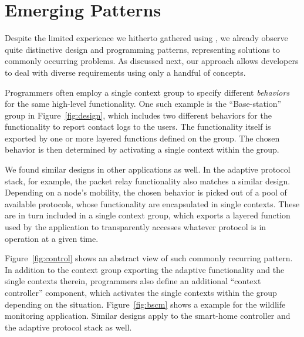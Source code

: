 \section{Emerging Patterns}
\label{sec:patterns}

Despite the limited experience we hitherto gathered using \conesc, we
already observe quite distinctive design and programming patterns,
representing solutions to commonly occurring problems. As discussed
next, our approach allows developers to deal with diverse requirements
using only a handful of concepts.



 Programmers often employ a single context
group to specify different \emph{behaviors} for the same high-level
functionality. One such example is the ``Base-station'' group in
Figure~\ref{fig:design}, which includes two different behaviors for
the functionality to report contact logs to the users. The
functionality itself is exported by one or more layered functions
defined on the group. The chosen behavior is then determined by
activating a single context within the group.

We found similar designs in other applications as well. In the
adaptive protocol stack, for example, the packet relay functionality
also matches a similar design. Depending on a node's mobility, the
chosen behavior is picked out of a pool of available protocols, whose
functionality are encapsulated in single contexts. These are in turn
included in a single context group, which exports a layered function
used by the application to transparently accesses whatever protocol
is in operation at a given time.


Figure~\ref{fig:control} shows an abstract view of such commonly
recurring pattern. In addition to the context group exporting the
adaptive functionality and the single contexts therein, programmers
also define an additional ``context controller'' component, which
activates the single contexts within the group depending on the
situation. Figure~\ref{fig:bscm} shows a \conesc example for the
wildlife monitoring application. Similar designs apply to the
smart-home controller and the adaptive protocol stack as well.

